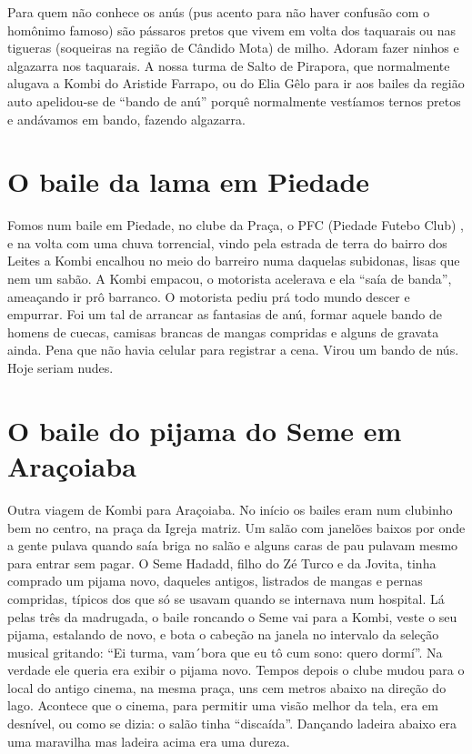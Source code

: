 \documentclass[12pt,brazil,]{book}
\begin{document}
Para quem não conhece os anús (pus acento para não haver confusão com o
homônimo famoso) são pássaros pretos que vivem em volta dos taquarais ou
nas tigueras (soqueiras na região de Cândido Mota) de milho. Adoram
fazer ninhos e algazarra nos taquarais. A nossa turma de Salto de
Pirapora, que normalmente alugava a Kombi do Aristide Farrapo, ou do
Elia Gêlo para ir aos bailes da região auto apelidou-se de ``bando de
anú'' porquê normalmente vestíamos ternos pretos e andávamos em bando,
fazendo algazarra.

\section{O baile da lama em Piedade}\label{o-baile-da-lama-em-piedade}

Fomos num baile em Piedade, no clube da Praça, o PFC (Piedade Futebo
Club) , e na volta com uma chuva torrencial, vindo pela estrada de terra
do bairro dos Leites a Kombi encalhou no meio do barreiro numa daquelas
subidonas, lisas que nem um sabão. A Kombi empacou, o motorista
acelerava e ela ``saía de banda'', ameaçando ir prô barranco. O
motorista pediu prá todo mundo descer e empurrar. Foi um tal de arrancar
as fantasias de anú, formar aquele bando de homens de cuecas, camisas
brancas de mangas compridas e alguns de gravata ainda. Pena que não
havia celular para registrar a cena. Virou um bando de nús. Hoje seriam
nudes.

\section{O baile do pijama do Seme em
Araçoiaba}\label{o-baile-do-pijama-do-seme-em-arauxe7oiaba}

Outra viagem de Kombi para Araçoiaba. No início os bailes eram num
clubinho bem no centro, na praça da Igreja matriz. Um salão com janelões
baixos por onde a gente pulava quando saía briga no salão e alguns caras
de pau pulavam mesmo para entrar sem pagar. O Seme Hadadd, filho do Zé
Turco e da Jovita, tinha comprado um pijama novo, daqueles antigos,
listrados de mangas e pernas compridas, típicos dos que só se usavam
quando se internava num hospital. Lá pelas três da madrugada, o baile
roncando o Seme vai para a Kombi, veste o seu pijama, estalando de novo,
e bota o cabeção na janela no intervalo da seleção musical gritando:
``Ei turma, vam´bora que eu tô cum sono: quero dormí''. Na verdade ele
queria era exibir o pijama novo. Tempos depois o clube mudou para o
local do antigo cinema, na mesma praça, uns cem metros abaixo na direção
do lago. Acontece que o cinema, para permitir uma visão melhor da tela,
era em desnível, ou como se dizia: o salão tinha ``discaída''. Dançando
ladeira abaixo era uma maravilha mas ladeira acima era uma dureza.
\end{document}
